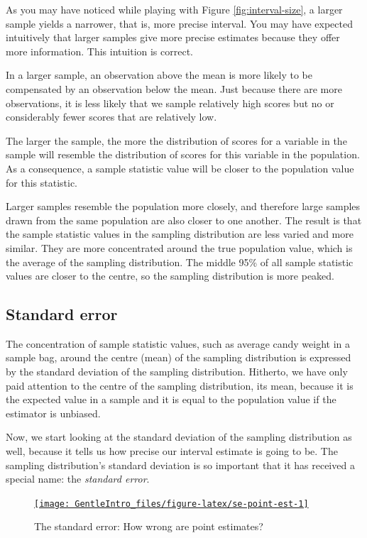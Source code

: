 \documentclass[a4paper]{book}
\theoremstyle{definition}
\theoremstyle{definition}
\theoremstyle{definition}
\theoremstyle{remark}
\begin{document}
As you may have noticed while playing with Figure
\ref{fig:interval-size}, a larger sample yields a narrower, that is,
more precise interval. You may have expected intuitively that larger
samples give more precise estimates because they offer more information.
This intuition is correct.

In a larger sample, an observation above the mean is more likely to be
compensated by an observation below the mean. Just because there are
more observations, it is less likely that we sample relatively high
scores but no or considerably fewer scores that are relatively low.

The larger the sample, the more the distribution of scores for a
variable in the sample will resemble the distribution of scores for this
variable in the population. As a consequence, a sample statistic value
will be closer to the population value for this statistic.

Larger samples resemble the population more closely, and therefore large
samples drawn from the same population are also closer to one another.
The result is that the sample statistic values in the sampling
distribution are less varied and more similar. They are more
concentrated around the true population value, which is the average of
the sampling distribution. The middle 95\% of all sample statistic
values are closer to the centre, so the sampling distribution is more
peaked.

\subsection{Standard error}\label{standard-error}

The concentration of sample statistic values, such as average candy
weight in a sample bag, around the centre (mean) of the sampling
distribution is expressed by the standard deviation of the sampling
distribution. Hitherto, we have only paid attention to the centre of the
sampling distribution, its mean, because it is the expected value in a
sample and it is equal to the population value if the estimator is
unbiased.

Now, we start looking at the standard deviation of the sampling
distribution as well, because it tells us how precise our interval
estimate is going to be. The sampling distribution's standard deviation
is so important that it has received a special name: the \emph{standard
error}.

\begin{figure}[H]
\href{http://82.196.4.233:3838/apps/se-point-est/}{\texttt{[image: GentleIntro\_files/figure-latex/se-point-est-1]} }\caption{The standard error: How wrong are point estimates?}\label{fig:se-point-est}
\end{figure}
\end{document}
